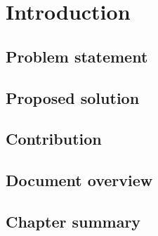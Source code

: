 \chapter{Introduction}\label{chapter:introduction}

\section{Problem statement}
\label{sec:problem_statement}

\section{Proposed solution}
\label{sec:proposed_solution}

\section{Contribution}
\label{sec:contribution}

\section{Document overview}
\label{sec:document_overview}

\section{Chapter summary}
